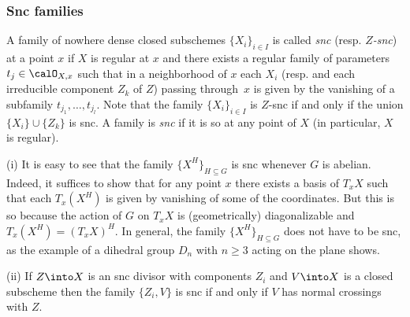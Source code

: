 \documentclass[10pt]{../fichiers-configuration-latex/smfart}
\begin{document}
\subsubsection{Snc families}\label{8-sncsec} A family of nowhere
dense closed subschemes $\{X_i\}_{i\in I}$ is called {\em snc}
(resp. {\em $Z$-snc}) at a point $x$ if $X$ is regular at $x$ and
there exists a regular family of parameters $t_j\in\calO_{X,x}$ such
that in a neighborhood of $x$ each $X_i$ (resp. and each irreducible
component $Z_k$ of $Z$) passing through $x$ is given by the vanishing of a subfamily
$t_{j_1},\dots,t_{j_l}$. Note that the family $\{X_i\}_{i\in I}$
is $Z$-snc if and only if the union $\{X_i\}\cup\{Z_k\}$ is snc. A
family is {\em snc} if it is so at any point of $X$ (in particular,
$X$ is regular).

\begin{remark2}\label{8-sncrem} (i) It is easy to see that the family
$\{X^H\}_{H\subseteq G}$ is snc whenever $G$ is abelian. Indeed,
it suffices to show that for any point $x$ there exists a basis of
$T_xX$ such that each $T_x(X^H)$ is given by vanishing of some of the
coordinates. But this is so because the action of $G$ on $T_xX$ is
(geometrically) diagonalizable and $T_x(X^H)=(T_xX)^H$. In general,
the family $\{X^H\}_{H\subseteq G}$ does not have to be snc, as
the example of a dihedral group $D_n$ with $n\ge 3$ acting on the
plane shows.

(ii) If $Z\into X$ is an snc divisor with components $Z_i$ and
$V\into X$ is a closed subscheme then the family $\{Z_i,V\}$ is
snc if and only if $V$ has normal crossings with $Z$.  \end{remark2}
\end{document}
